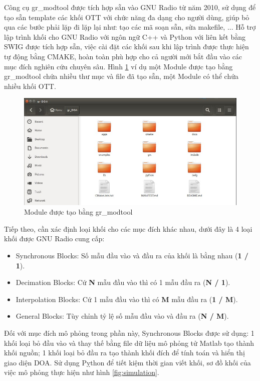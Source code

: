 {Công cụ gr\_modtool được tích hợp sẵn vào GNU Radio từ năm 2010, sử dụng để tạo sẵn template các khối OTT với chức năng đa dạng cho người dùng, giúp bỏ qua các bước phải lặp đi lặp lại như: tạo các mã soạn sẵn, sửa makefile, ... Hỗ trợ lập trình khối cho GNU Radio với ngôn ngữ C++ và Python với liên kết bằng SWIG được tích hợp sẵn, việc cài đặt các khối sau khi lập trình được thực  hiện tự động bằng CMAKE, hoàn toàn phù hợp cho cả người mới bắt đầu vào các mục đích nghiên cứu chuyên sâu. Hình \ref{fig:grmodtool} ví dụ một Module được tạo bằng gr\_modtool chứa nhiều thư mục và file đã tạo sẵn, một Module có thể chứa nhiều khối OTT.

\begin{figure} [h]
	\centering
	\includegraphics[width=1\linewidth]{figures/grmodtool.jpg}
	\caption{Module được tạo bằng gr\_modtool}
	\label{fig:grmodtool}
\end{figure}

Tiếp theo, cần xác định loại khối cho các mục đích khác nhau, dưới đây là 4 loại khối được GNU Radio cung cấp:
\renewcommand{\labelitemi}{$\bullet$}
\begin{itemize}
	\item Synchronous Blocks: Số mẫu đầu vào và đầu ra của khối là bằng nhau (\textbf{1 / 1}).
	\item Decimation Blocks: Cứ \textbf{N} mẫu đầu vào thì có 1 mẫu đầu ra (\textbf{N / 1}).
	\item Interpolation Blocks: Cứ 1 mẫu đầu vào thì có \textbf{M} mẫu đầu ra (\textbf{1 / M}).
	\item General Blocks: Tùy chỉnh tỷ lệ số mẫu đầu vào và đầu ra (\textbf{N / M}).
\end{itemize}

Đối với mục đích mô phỏng trong phần này, Synchronous Blocks được sử dụng: 1 khối loại bỏ đầu vào và thay thế bằng file dữ liệu mô phỏng tử Matlab tạo thành khối nguồn; 1 khối loại bỏ đầu ra tạo thành khối đích để tính toán và hiển thị giao diện DOA. Sử dụng Pỵthon để tiết kiệm thời gian viết khối, sơ đồ khối của việc mô phỏng thực hiện như hình \ref{fig:simulation}.

}
